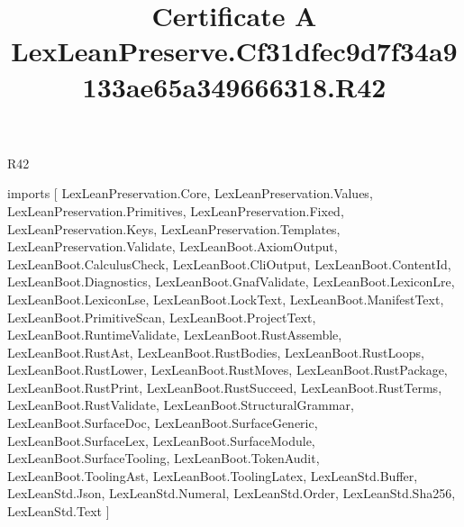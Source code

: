 \begin{lexlean}{R42}
\title{Certificate A LexLeanPreserve.Cf31dfec9d7f34a9133ae65a349666318.R42}
\begin{coremodule}
imports [
  LexLeanPreservation.Core,
  LexLeanPreservation.Values,
  LexLeanPreservation.Primitives,
  LexLeanPreservation.Fixed,
  LexLeanPreservation.Keys,
  LexLeanPreservation.Templates,
  LexLeanPreservation.Validate,
  LexLeanBoot.AxiomOutput,
  LexLeanBoot.CalculusCheck,
  LexLeanBoot.CliOutput,
  LexLeanBoot.ContentId,
  LexLeanBoot.Diagnostics,
  LexLeanBoot.GnafValidate,
  LexLeanBoot.LexiconLre,
  LexLeanBoot.LexiconLse,
  LexLeanBoot.LockText,
  LexLeanBoot.ManifestText,
  LexLeanBoot.PrimitiveScan,
  LexLeanBoot.ProjectText,
  LexLeanBoot.RuntimeValidate,
  LexLeanBoot.RustAssemble,
  LexLeanBoot.RustAst,
  LexLeanBoot.RustBodies,
  LexLeanBoot.RustLoops,
  LexLeanBoot.RustLower,
  LexLeanBoot.RustMoves,
  LexLeanBoot.RustPackage,
  LexLeanBoot.RustPrint,
  LexLeanBoot.RustSucceed,
  LexLeanBoot.RustTerms,
  LexLeanBoot.RustValidate,
  LexLeanBoot.StructuralGrammar,
  LexLeanBoot.SurfaceDoc,
  LexLeanBoot.SurfaceGeneric,
  LexLeanBoot.SurfaceLex,
  LexLeanBoot.SurfaceModule,
  LexLeanBoot.SurfaceTooling,
  LexLeanBoot.TokenAudit,
  LexLeanBoot.ToolingAst,
  LexLeanBoot.ToolingLatex,
  LexLeanStd.Buffer,
  LexLeanStd.Json,
  LexLeanStd.Numeral,
  LexLeanStd.Order,
  LexLeanStd.Sha256,
  LexLeanStd.Text
]


\end{coremodule}
\end{lexlean}
